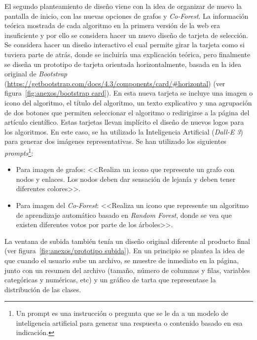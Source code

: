 El segundo planteamiento de diseño viene con la idea de organizar de nuevo la pantalla de inicio, con las nuevas opciones de grafos y \textit{Co-Forest}. La información teórica mostrada de cada algoritmo en la primera versión de la web era insuficiente y por ello se considera hacer un nuevo diseño de tarjeta de selección. Se considera hacer un diseño interactivo el cual permite girar la tarjeta como si tuviera parte de atrás, donde se incluiría una explicación teórica, pero finalmente se diseña un prototipo de tarjeta orientada horizontalmente, basada en la idea original de \textit{Bootstrap} (\url{https://getbootstrap.com/docs/4.3/components/card/#horizontal}) (ver figura~\ref{fig:anexos/bootstrap card}). En esta nueva tarjeta se incluye una imagen o icono del algoritmo, el título del algoritmo, un texto explicativo y una agrupación de dos botones que permiten seleccionar el algoritmo o redirigirse a la página del artículo científico.
Estas tarjetas llevan implícito el diseño de nuevos logos para los algoritmos. En este caso, se ha utilizado la Inteligencia Artificial (\textit{Dall-E 3}) para generar dos imágenes representativas. Se han utilizado los siguientes \textit{prompts}\footnote{Un prompt es una instrucción o pregunta que se le da a un modelo de inteligencia artificial para generar una respuesta o contenido basado en esa indicación.}:
\begin{itemize}
	\item Para imagen de grafos: <<Realiza un icono que represente un grafo con nodos y enlaces. Los nodos deben dar sensación de lejanía y deben tener diferentes colores>>.
	\item Para imagen del \textit{Co-Forest}: <<Realiza un icono que represente un algoritmo de aprendizaje automático basado en \textit{Random Forest}, donde se vea que existen diferentes votos por parte de los árboles>>.
\end{itemize}

La ventana de subida también tenía un diseño original diferente al producto final (ver figura~\ref{fig:anexos/prototipo subida}). En un principio se plantea la idea de que cuando el usuario sube un archivo, se muestre de inmediato en la página, junto con un resumen del archivo (tamaño, número de columnas y filas, variables categóricas y numéricas, etc) y un gráfico de tarta que representase la distribución de las clases.

